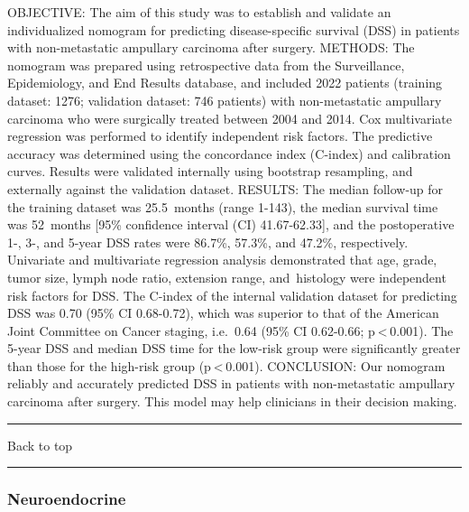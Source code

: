 \documentclass[]{article}
\begin{document}
OBJECTIVE: The aim of this study was to establish and validate an
individualized nomogram for predicting disease-specific survival (DSS)
in patients with non-metastatic ampullary carcinoma after surgery.
METHODS: The nomogram was prepared using retrospective data from the
Surveillance, Epidemiology, and End Results database, and included 2022
patients (training dataset: 1276; validation dataset: 746 patients) with
non-metastatic ampullary carcinoma who were surgically treated between
2004 and 2014. Cox multivariate regression was performed to identify
independent risk factors. The predictive accuracy was determined using
the concordance index (C-index) and calibration curves. Results were
validated internally using bootstrap resampling, and externally against
the validation dataset. RESULTS: The median follow-up for the training
dataset was 25.5~months (range 1-143), the median survival time was
52~months {[}95\% confidence interval (CI) 41.67-62.33{]}, and the
postoperative 1-, 3-, and 5-year DSS rates were 86.7\%, 57.3\%, and
47.2\%, respectively. Univariate and multivariate regression analysis
demonstrated that age, grade, tumor size, lymph node ratio, extension
range, and~histology were independent risk factors for DSS. The C-index
of the internal validation dataset for predicting DSS was 0.70 (95\% CI
0.68-0.72), which was superior to that of the American Joint Committee
on Cancer staging, i.e.~0.64 (95\% CI 0.62-0.66; p \textless{} 0.001).
The 5-year DSS and median DSS time for the low-risk group were
significantly greater than those for the high-risk group
(p \textless{} 0.001). CONCLUSION: Our nomogram reliably and accurately
predicted DSS in patients with non-metastatic ampullary carcinoma after
surgery. This model may help clinicians in their decision making.

{}

{}

\begin{center}\rule{0.5\linewidth}{\linethickness}\end{center}

Back to top

\begin{center}\rule{0.5\linewidth}{\linethickness}\end{center}

\pagebreak

\hypertarget{neuroendocrine}{%
\subsubsection{Neuroendocrine}\label{neuroendocrine}}
\end{document}
